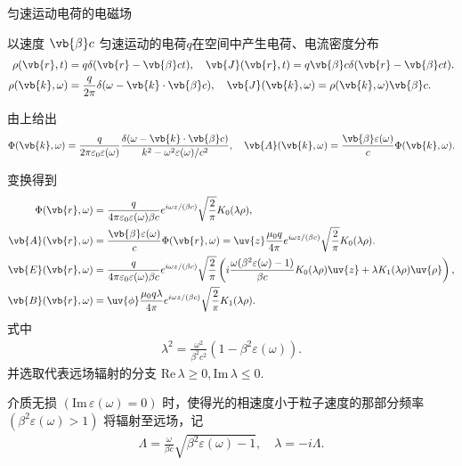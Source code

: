 \begin{exbox}
	匀速运动电荷的电磁场

	以速度 \(\vb{\beta}c\) 匀速运动的电荷\(q\)在空间中产生电荷、电流密度分布
	\begin{align*}
		\rho(\vb{r},t) &= q \delta(\vb{r} - \vb{\beta} c t), \quad
		\vb{J}(\vb{r},t) = q \vb{\beta} c \delta(\vb{r} - \vb{\beta} c t). \\
		\rho(\vb{k},\omega) &= \frac{q}{2\pi} \delta(\omega - \vb{k} \cdot \vb{\beta} c), \quad
		\vb{J}(\vb{k},\omega) = \rho(\vb{k},\omega) \vb{\beta} c.
	\end{align*}

	由上给出
	\begin{align*}
		\Phi(\vb{k},\omega) = \frac{q}{2\pi \varepsilon_{0} \varepsilon(\omega)} \frac{\delta(\omega - \vb{k} \cdot \vb{\beta} c)}{k^{2} - \omega^{2} \varepsilon(\omega)/c^{2}}, \quad
		\vb{A}(\vb{k},\omega) = \frac{\vb{\beta} \varepsilon(\omega)}{c} \Phi(\vb{k},\omega).
	\end{align*}

	变换得到
	\begin{align*}
		\Phi(\vb{r},\omega) &= \frac{q}{4\pi \varepsilon_{0} \varepsilon(\omega) \beta c} e^{i\omega z/(\beta c)} \sqrt{\frac{2}{\pi}} K_{0}(\lambda \rho), \\
		\vb{A}(\vb{r},\omega) &= \frac{\vb{\beta} \varepsilon(\omega)}{c} \Phi(\vb{r},\omega) = \uv{z} \frac{\mu_{0} q}{4\pi} e^{i\omega z/(\beta c)} \sqrt{\frac{2}{\pi}} K_{0}(\lambda \rho).\\
		\vb{E}(\vb{r},\omega) &= \frac{q}{4\pi \varepsilon_{0} \varepsilon(\omega) \beta c} e^{i\omega z/(\beta c)} \sqrt{\frac{2}{\pi}} \left( i \frac{\omega (\beta^{2} \varepsilon(\omega) - 1)}{\beta c} K_{0}(\lambda \rho) \uv{z} + \lambda K_{1}(\lambda \rho) \uv{\rho} \right), \\
		\vb{B}(\vb{r},\omega) &= \uv{\phi} \frac{\mu_{0} q \lambda}{4\pi} e^{i\omega z/(\beta c)} \sqrt{\frac{2}{\pi}} K_{1}(\lambda \rho).
	\end{align*}
	式中
	\begin{align*}
		\lambda^{2} = \frac{\omega^{2}}{\beta^{2} c^{2}} (1 - \beta^{2} \varepsilon(\omega)).
	\end{align*}
	并选取代表远场辐射的分支 \(\mathrm{Re} \, \lambda \ge 0, \mathrm{Im} \, \lambda \le 0\).

	介质无损 \((\mathrm{Im} \, \varepsilon(\omega) = 0)\) 时，使得光的相速度小于粒子速度的那部分频率 \((\beta^{2} \varepsilon(\omega) > 1)\) 将辐射至远场，记
	\begin{align*}
		\Lambda = \frac{\omega}{\beta c} \sqrt{\beta^{2} \varepsilon(\omega) - 1}, \quad
		\lambda= -i \Lambda.
	\end{align*}


\end{exbox}

